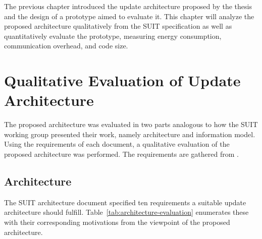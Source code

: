 \documentclass[0-thesis.tex]{subfiles}
\begin{document}
The previous chapter introduced the update architecture proposed by the thesis and the
design of a prototype aimed to evaluate it. This chapter will analyze the proposed
architecture qualitatively from the SUIT specification as well as quantitatively evaluate
the prototype, measuring energy consumption, communication overhead, and code size.

\section{Qualitative Evaluation of Update Architecture}
\label{sec:qual-evaluation}
The proposed architecture was evaluated in two parts analogous to how the SUIT working
group presented their work, namely architecture and information model. Using the
requirements of each document, a qualitative evaluation of the proposed architecture was
performed. The requirements are gathered from \parencite{suit-architecture,
suit-information-model}.

\subsection{Architecture}
\label{ssec:arch-evaluation}
The SUIT architecture document specified ten requirements a suitable update architecture
should fulfill. Table~\ref{tab:architecture-evaluation} enumerates these with their
corresponding motivations from the viewpoint of the proposed architecture.
\end{document}
